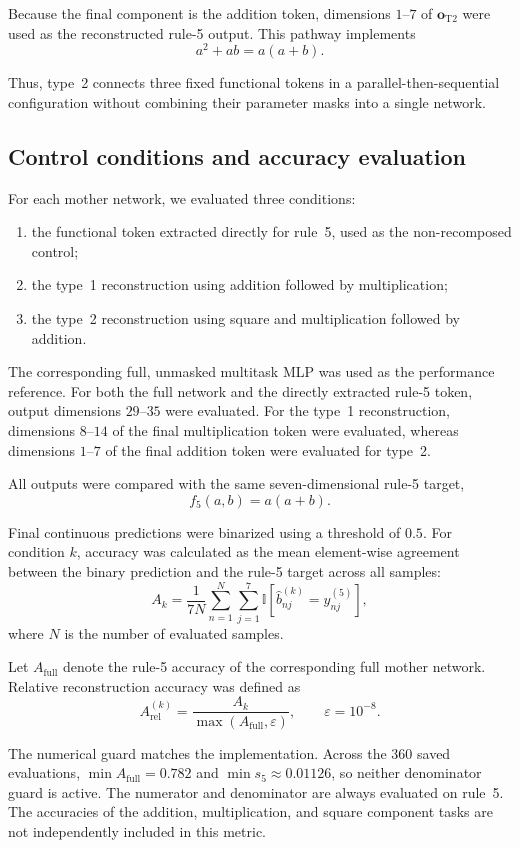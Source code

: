 \documentclass{article}
\begin{document}
Because the final component is the addition token, dimensions $1$--$7$ of $\mathbf{o}_{\mathrm{T2}}$ were used as the reconstructed rule-5 output. This pathway implements
\[
a^2+ab=a(a+b).
\]

Thus, type~2 connects three fixed functional tokens in a parallel-then-sequential configuration without combining their parameter masks into a single network.

\subsection{Control conditions and accuracy evaluation}

For each mother network, we evaluated three conditions:
\begin{enumerate}
    \item the functional token extracted directly for rule~5, used as the non-recomposed control;
    \item the type~1 reconstruction using addition followed by multiplication;
    \item the type~2 reconstruction using square and multiplication followed by addition.
\end{enumerate}

The corresponding full, unmasked multitask MLP was used as the performance reference. For both the full network and the directly extracted rule-5 token, output dimensions $29$--$35$ were evaluated. For the type~1 reconstruction, dimensions $8$--$14$ of the final multiplication token were evaluated, whereas dimensions $1$--$7$ of the final addition token were evaluated for type~2.

All outputs were compared with the same seven-dimensional rule-5 target,
\[
f_5(a,b)=a(a+b).
\]

Final continuous predictions were binarized using a threshold of $0.5$. For condition $k$, accuracy was calculated as the mean element-wise agreement between the binary prediction and the rule-5 target across all samples:
\[
A_k
=
\frac{1}{7N}
\sum_{n=1}^{N}
\sum_{j=1}^{7}
\mathbb{I}
\left[
\hat{b}_{nj}^{(k)}
=
y_{nj}^{(5)}
\right],
\]
where $N$ is the number of evaluated samples.

Let $A_{\mathrm{full}}$ denote the rule-5 accuracy of the corresponding full mother network. Relative reconstruction accuracy was defined as
\[
A_{\mathrm{rel}}^{(k)}
=
\frac{
A_k
}{
\max(A_{\mathrm{full}},\varepsilon)
},
\qquad
\varepsilon=10^{-8}.
\]

The numerical guard matches the implementation. Across the 360 saved evaluations, $\min A_{\mathrm{full}}=0.782$ and $\min s_5\approx0.01126$, so neither denominator guard is active. The numerator and denominator are always evaluated on rule~5. The accuracies of the addition, multiplication, and square component tasks are not independently included in this metric.
\end{document}
